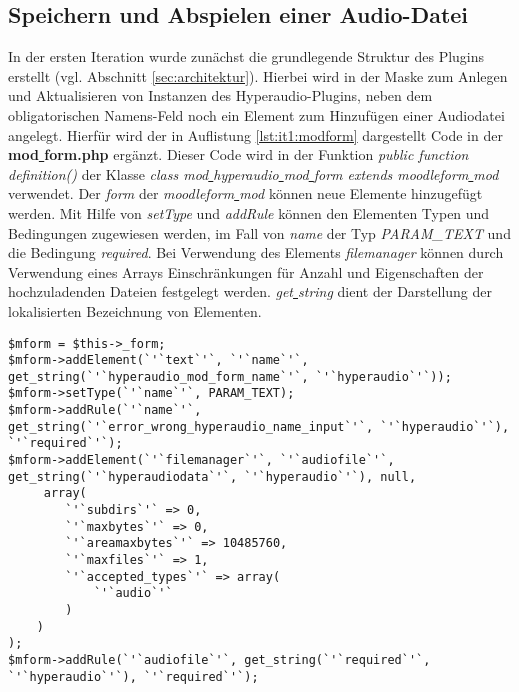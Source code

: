 \subsection{Speichern und Abspielen einer Audio-Datei}
In der ersten Iteration wurde zunächst die grundlegende Struktur des Plugins erstellt (vgl. Abschnitt \ref{sec:architektur}). Hierbei wird in der Maske zum Anlegen und Aktualisieren von Instanzen des Hyperaudio-Plugins, neben dem obligatorischen Namens-Feld noch ein Element zum Hinzufügen einer Audiodatei angelegt. Hierfür wird der in Auflistung \ref{lst:it1:modform} dargestellt Code in der \textbf{mod\underline{{ }}form.php} ergänzt. Dieser Code wird in der Funktion \textit{public function definition()} der Klasse \textit{class mod\underline{{ }}hyperaudio\underline{{ }}mod\underline{{ }}form extends moodleform\underline{{ }}mod} verwendet. Der \textit{\underline{{ }}form} der \textit{moodleform\underline{{ }}mod} können neue Elemente hinzugefügt werden. Mit Hilfe von \textit{setType} und \textit{addRule} können den Elementen Typen und Bedingungen zugewiesen werden, im Fall von \textit{name} der Typ \textit{PARAM_TEXT} und die Bedingung \textit{required}. Bei Verwendung des Elements \textit{filemanager} können durch Verwendung eines Arrays Einschränkungen für Anzahl und Eigenschaften der hochzuladenden Dateien  festgelegt werden. \textit{get\underline{{ }}string} dient der Darstellung der lokalisierten Bezeichnung von Elementen.

\begin{lstlisting}[basicstyle=\small,
             inputencoding={utf8}, 
             extendedchars=false,
             commentstyle=\color{black}, 
             keywordstyle=\color{black}, 
             escapeinside=``,
             linewidth=\textwidth,
             caption={Ausschnitt der \textbf{mod\underline{{ }}form.php} in der 1. Iteration},
             label={lst:it1:modform}]
$mform = $this->_form;             
$mform->addElement(`'`text`'`, `'`name`'`, get_string(`'`hyperaudio_mod_form_name`'`, `'`hyperaudio`'`));
$mform->setType(`'`name`'`, PARAM_TEXT);
$mform->addRule(`'`name`'`, get_string(`'`error_wrong_hyperaudio_name_input`'`, `'`hyperaudio`'`), `'`required`'`);
$mform->addElement(`'`filemanager`'`, `'`audiofile`'`, get_string(`'`hyperaudiodata`'`, `'`hyperaudio`'`), null,
     array(
        `'`subdirs`'` => 0,
        `'`maxbytes`'` => 0,
		`'`areamaxbytes`'` => 10485760,
		`'`maxfiles`'` => 1,
		`'`accepted_types`'` => array(
			`'`audio`'`
		)
	)
);
$mform->addRule(`'`audiofile`'`, get_string(`'`required`'`, `'`hyperaudio`'`), `'`required`'`);
\end{lstlisting}

